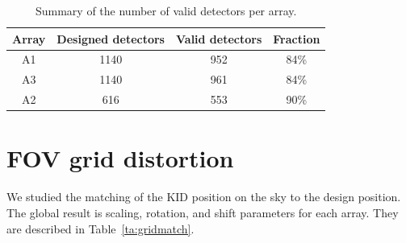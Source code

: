 
\begin{table}[ht]
\begin{center}  
  \begin{tabular}{|c|c|c|c|}
    \hline
    Array & Designed detectors &  Valid detectors & Fraction\\
    \hline\hline
    A1 & 1140 & 952 &  84\%\\
    A3 & 1140 & 961 &  84\%\\
    A2 & 616  & 553 &  90\%\\
    \hline
  \end{tabular}
  \caption[Number of detectors]{Summary of the number of valid detectors per array.}
  \label{tab:number_of_kids}
\end{center}    
\end{table}


\section{FOV grid distortion}%
\label{se:grid_distortion}

We studied the matching of the KID position on the sky to the
design position. The global result is scaling, rotation, and shift parameters for each
array. They are described in Table~\ref{ta:gridmatch}.

